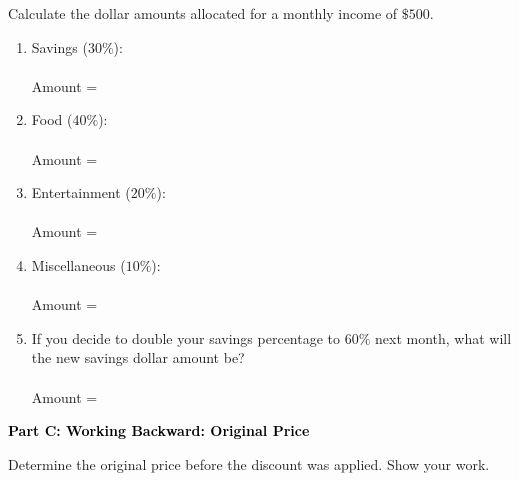\documentclass[12pt, letterpaper, fleqn]{article}
\newcommand{\blanklong}{\underline{\hspace{6.5cm}}}
\begin{document}
\vspace{3mm}

\noindent
Calculate the dollar amounts allocated for a monthly income of $\$500$.

\vspace{5mm}

\begin{enumerate}[itemsep=1.5cm, leftmargin=0.6cm]
\item Savings ($30\%$): \\ \\
Amount = \blanklong

\item Food ($40\%$): \\ \\
Amount = \blanklong

\item Entertainment ($20\%$): \\ \\
Amount = \blanklong

\item Miscellaneous ($10\%$): \\ \\
Amount = \blanklong

\item If you decide to double your savings percentage to $60\%$ next month, what will the new savings dollar amount be? \\ \\
Amount = \blanklong
\end{enumerate}

\newpage

\begin{tcolorbox}[colback=black!10]
    \large\textcolor{black}{\textbf{Part C: Working Backward: Original Price}}
\end{tcolorbox}

\vspace{3mm}

\noindent
Determine the original price before the discount was applied. Show your work.

\vspace{5mm}
\end{document}

